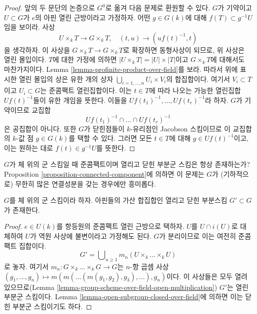 \begin{proof}
\medskip\noindent
앞의 두 문단의 논증으로 $G^0$로 옮겨 다음 문제로 환원할 수 있다.
$G$가 기약이고 $U \subset G$가 $e$의 아핀 열린 근방이라고 가정하자. 어떤 $g \in G(k)$에 대해
$f(T) \subset g^{-1}U$임을 보이라. 사상
$$
U \times_k T \longrightarrow G \times_k T,\quad
(t, u) \longrightarrow (uf(t)^{-1}, t)
$$
을 생각하자. 이 사상을 $G \times_k T \to G \times_k T$로 확장하면 동형사상이 되므로, 위 사상은
열린 몰입이다. $T$에 대한 가정에 의하면 $|U \times_k T| = |U| \times |T|$이고
$G \times_k T$에 대해서도 마찬가지이다. Lemma \ref{lemma-profinite-product-over-field}를 보라.
따라서 위에 표시한 열린 몰입의 상은 유한 개의 상자
$\bigcup_{i = 1, \ldots, n} U_i \times V_i$의 합집합이다. 여기서 $V_i \subset T$이고
$U_i \subset G$는 준콤팩트 열린집합이다. 이는 $t \in T$에 따라 나오는 가능한 열린집합
$Uf(t)^{-1}$들이 유한 개임을 뜻한다. 이들을 $Uf(t_1)^{-1}, \ldots, Uf(t_r)^{-1}$라 하자.
$G$가 기약이므로 교집합
$$
Uf(t_1)^{-1} \cap \ldots \cap Uf(t_r)^{-1}
$$
은 공집합이 아니다. 또한 $G$가 닫힌점들이 $k$-유리점인 Jacobson 스킴이므로 이 교집합의
$k$-값 점 $g \in G(k)$를 택할 수 있다. 그러면 모든 $t \in T$에 대해 $g \in Uf(t)^{-1}$이고,
이는 원하는 대로 $f(t) \in g^{-1}U$를 뜻한다.
\end{proof}

\begin{remark}
\label{remark-easy}
$G$가 체 위의 군 스킴일 때 준콤팩트이며 열리고 닫힌 부분군 스킴은 항상 존재하는가?
Proposition \ref{proposition-connected-component}에 의하면 이 문제는 $G$가 (기하적으로) 무한히 많은
연결성분을 갖는 경우에만 흥미롭다.
\end{remark}

\begin{lemma}
\label{lemma-group-scheme-field-countable-affine}
$G$를 체 위의 군 스킴이라 하자. 아핀들의 가산 합집합인 열리고 닫힌 부분스킴
$G' \subset G$가 존재한다.
\end{lemma}

\begin{proof}
$e \in U(k)$를 항등원의 준콤팩트 열린 근방으로 택하자. $U$를 $U \cap i(U)$로 대체하여
$U$가 역원 사상에 불변이라고 가정해도 된다. $G$가 분리이므로 이는 여전히 준콤팩트 집합이다.
$$
G' = \bigcup\nolimits_{n \geq 1} m_n(U \times_k \ldots \times_k U)
$$
로 놓자. 여기서 $m_n : G \times_k \ldots \times_k G \to G$는 $n$-항 곱셈 사상
$(g_1, \ldots, g_n) \mapsto m(m(\ldots (m(g_1, g_2), g_3), \ldots ), g_n)$이다.
이 사상들은 모두 열려 있으므로(Lemma \ref{lemma-group-scheme-over-field-open-multiplication})
$G'$는 열린 부분군 스킴이다. Lemma \ref{lemma-open-subgroup-closed-over-field}에 의하면
이는 닫힌 부분군 스킴이기도 하다.
\end{proof}






